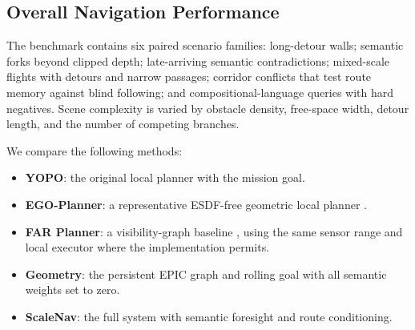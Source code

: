 \documentclass[letterpaper,10pt,conference]{ieeeconf}
\begin{document}
\begin{table}[t]
\caption{Fixed Parameters Used by the Current Implementation}
\label{tab:params}
\centering
\small
{}
\end{table}

\subsection{Overall Navigation Performance}
The benchmark contains six paired scenario families: long-detour walls;
semantic forks beyond clipped depth; late-arriving semantic contradictions;
mixed-scale flights with detours and narrow passages; corridor conflicts
that test route memory against blind following; and compositional-language
queries with hard negatives. Scene complexity is varied by obstacle density,
free-space width, detour length, and the number of competing branches.

We compare the following methods:
\begin{itemize}
  \item \textbf{YOPO}: the original local planner with the mission goal.
  \item \textbf{EGO-Planner}: a representative ESDF-free geometric local
  planner \cite{egoplanner}.
  \item \textbf{FAR Planner}: a visibility-graph baseline \cite{far}, using
  the same sensor range and local executor where the implementation permits.
  \item \textbf{Geometry}: the persistent EPIC graph and rolling goal with
  all semantic weights set to zero.
  \item \textbf{ScaleNav}: the full system with semantic foresight and route
  conditioning.
\end{itemize}
\end{document}
